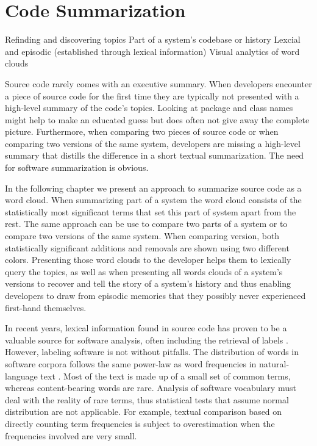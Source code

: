 
\chapter{Code Summarization}
\label{the chapter on LogLR}

\infobox
	{Refinding and discovering topics}
	{Part of a system's codebase or history}
	{Lexcial and episodic (established through lexical information)}
	{Visual analytics of word clouds}

Source code rarely comes with an executive summary. When developers encounter a piece of source code for the first time they are typically not presented with a high-level summary of the code's topics. Looking at package and class names might help to make an educated guess but does often not give away the complete picture. Furthermore, when comparing two pieces of source code or when comparing two versions of the same system, developers are missing a high-level summary that distills the difference in a short textual summarization. The need for software summarization is obvious.

In the following chapter we present an approach to summarize source code as a word cloud. When summarizing part of a system the word cloud consists of the statistically most significant terms that set this part of system apart from the rest. The same approach can be use to compare two parts of a system or to compare two versions of the same system. When comparing version, both statistically significant additions and removals are shown using two different colors. Presenting those word clouds to the developer helps them to lexically query the topics, as well as when presenting all words clouds of a system's versions to recover and tell the story of a system's history and thus enabling developers to draw from episodic memories that they possibly never experienced first-hand themselves.

\asteriskasteriskasterisk


In recent years, lexical information found in source code has proven to be a valuable source for software analysis, often including the retrieval of labels \cite{Bald08a,EinarHoest,Kuhn07a}. However, labeling software is not without pitfalls. The distribution of words in software corpora follows the same power-law as word frequencies in natural-language text \cite{Linstead09SUITE}. Most of the text is made up of a small set of common terms, whereas content-bearing words are rare. Analysis of software vocabulary must deal with the reality of rare terms, thus statistical tests that assume normal distribution are not applicable. For example, textual comparison based on directly counting term frequencies is subject to overestimation when the frequencies involved are very small.  

